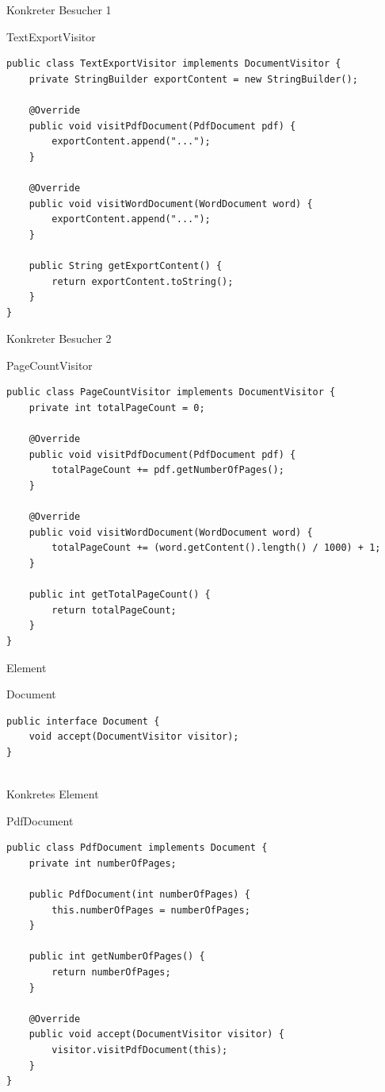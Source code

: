 \begin{frame}[fragile]{Konkreter Besucher 1}
	\begin{exampleblock}{TextExportVisitor}
 		\begin{lstlisting}
public class TextExportVisitor implements DocumentVisitor {
	private StringBuilder exportContent = new StringBuilder();

	@Override
	public void visitPdfDocument(PdfDocument pdf) {
		exportContent.append("...");
	}

	@Override
	public void visitWordDocument(WordDocument word) {
		exportContent.append("...");
	}

	public String getExportContent() {
		return exportContent.toString();
	}
}
 		\end{lstlisting}
 	\end{exampleblock}
\end{frame}

\begin{frame}[fragile]{Konkreter Besucher 2}
	\begin{exampleblock}{PageCountVisitor}
 		\begin{lstlisting}
public class PageCountVisitor implements DocumentVisitor {
	private int totalPageCount = 0;

	@Override
	public void visitPdfDocument(PdfDocument pdf) {
		totalPageCount += pdf.getNumberOfPages();
	}

	@Override
	public void visitWordDocument(WordDocument word) {
		totalPageCount += (word.getContent().length() / 1000) + 1;
	}

	public int getTotalPageCount() {
		return totalPageCount;
	}
}    
 		\end{lstlisting}
 	\end{exampleblock}
\end{frame}

\begin{frame}[fragile]{Element}
	\begin{exampleblock}{Document}
 		\begin{lstlisting}
public interface Document {
    void accept(DocumentVisitor visitor);
}
    
 		\end{lstlisting}
 	\end{exampleblock}
\end{frame}

\begin{frame}[fragile]{Konkretes Element}
	\begin{exampleblock}{PdfDocument}
 		\begin{lstlisting}
public class PdfDocument implements Document {
	private int numberOfPages;

	public PdfDocument(int numberOfPages) {
		this.numberOfPages = numberOfPages;
	}

	public int getNumberOfPages() {
		return numberOfPages;
	}

	@Override
	public void accept(DocumentVisitor visitor) {
		visitor.visitPdfDocument(this);
	}
}

 		\end{lstlisting}
 	\end{exampleblock}
\end{frame}

